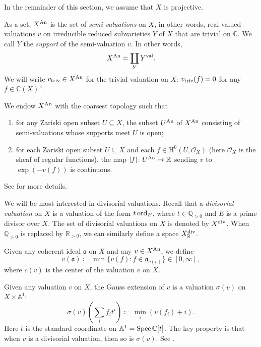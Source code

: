 In the remainder of this section, we assume that $X$ is projective.

As a set, $X^{\mathrm{An}}$ is the set of \emph{semi-valuations} on $X$, in other words, real-valued valuations $v$ on irreducible reduced subvarieties $Y$ of $X$ that are trivial on $\mathbb{C}$. We call $Y$ the \emph{support} of the semi-valuation $v$.
In other words,
\[
X^{\mathrm{An}}=\coprod_{Y} Y^{\mathrm{val}}.
\]
We will write $v_{\mathrm{triv}}\in X^{\mathrm{An}}$ for the trivial valuation on $X$: $v_{\mathrm{triv}}(f)=0$ for any $f\in \mathbb{C}(X)^{\times}$.

We endow $X^{\mathrm{An}}$ with the coarsest topology such that
\begin{enumerate}
    \item\label{itm:chapter-NApotential:L902:1} for any Zariski open subset $U\subseteq X$, the subset $U^{\mathrm{An}}$ of $X^{\mathrm{An}}$ consisting of semi-valuations whose supports meet $U$ is open;
    \item\label{itm:chapter-NApotential:L902:2} for each Zariski open subset $U\subseteq X$ and each $f\in \mathrm{H}^0(U,\mathcal{O}_X)$ (here $\mathcal{O}_X$ is the sheaf of regular functions), the map $|f|\colon U^{\mathrm{An}}\rightarrow \mathbb{R}$ sending $v$ to $\exp(-v(f))$ is continuous.
\end{enumerate}
See \cite{Berk93} for more details.

We will be most interested in divisorial valuations. Recall that a \emph{divisorial valuation} on $X$ is a valuation of the form $t\operatorname{ord}_E$, where $t\in \mathbb{Q}_{>0}$ and $E$ is a prime divisor over $X$. The set of divisorial valuations on $X$ is denoted by $X^{\operatorname{div}}$. When $\mathbb{Q}_{>0}$ is replaced by $\mathbb{R}_{>0}$, we can similarly define a space $X^{\operatorname{div}}_{\mathbb{R}}$.

Given any coherent ideal $\mathfrak{a}$ on $X$ and any $v\in X^{\mathrm{An}}$, we define
\begin{equation}\label{eq:va}
v(\mathfrak{a})\coloneqq\min\{v(f):f\in \mathfrak{a}_{c(v)}\}\in [0,\infty],
\end{equation}
where $c(v)$ is the center of the valuation $v$ on $X$.

Given any valuation $v$ on $X$, the Gauss extension of $v$ is a valuation $\sigma(v)$ on $X\times \mathbb{A}^1$:
\begin{equation}\label{eq:Gext}
\sigma(v)\left(\sum_i f_i t^i\right)\coloneqq\min_i (v(f_i)+i).
\end{equation}
Here $t$ is the standard coordinate on $\mathbb{A}^1=\operatorname{Spec} \mathbb{C}[t]$. The key property is that when $v$ is a divisorial valuation, then so is $\sigma(v)$. See \cite[Lemma~4.2]{BHJ17}.


